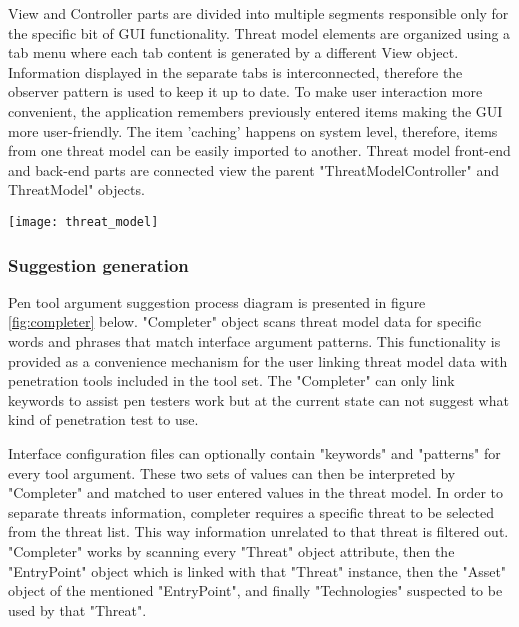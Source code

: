 View and Controller parts are divided into multiple segments responsible only for the specific bit of GUI functionality. Threat model elements are organized using a tab menu where each tab content is generated by a different View object. Information displayed in the separate tabs is interconnected, therefore the observer pattern is used to keep it up to date. To make user interaction more convenient, the application remembers previously entered items making the GUI more user-friendly. The item 'caching' happens on system level, therefore, items from one threat model can be easily imported to another. Threat model front-end and back-end parts are connected view the parent "ThreatModelController" and ThreatModel" objects.


\begin{center}
	\begin{sideways}%
		\begin{minipage}{\textheight}
			\texttt{[image: threat\_model]}
			\label{fig:threat-model-struct}
		\end{minipage}
	\end{sideways}
\end{center}

\subsubsection{Suggestion generation}
Pen tool argument suggestion process diagram is presented in figure \ref{fig:completer} below.\newline
"Completer" object scans threat model data for specific words and phrases that match interface argument patterns. This functionality is provided as a convenience mechanism for the user linking threat model data with penetration tools included in the tool set. The "Completer" can only link keywords to assist pen testers work but at the current state can not suggest what kind of penetration test to use.

Interface configuration files can optionally contain "keywords" and "patterns" for every tool argument. These two sets of values can then be interpreted by "Completer" and matched to user entered values in the threat model. In order to separate threats information, completer requires a specific threat  to be selected from the threat list. This way information unrelated to that threat is filtered out. "Completer" works by scanning every "Threat" object attribute, then the "EntryPoint" object which is linked with that "Threat" instance, then the "Asset" object of the mentioned "EntryPoint", and finally "Technologies" suspected to be used by that "Threat".

